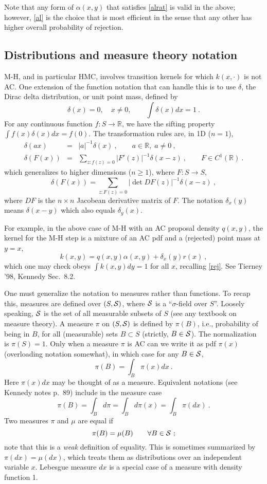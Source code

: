 \documentclass[10pt]{article}
\newcommand{\be}{\begin{equation}}
\newcommand{\ee}{\end{equation}}
\newcommand{\bea}{\begin{eqnarray}}
\newcommand{\eea}{\end{eqnarray}}
\newcommand{\R}{\mathbb{R}}
\newcommand{\al}{\alpha}
\begin{document}
Note that any form of $\al(x,y)$ that satisfies \eqref{alrat} is valid
in the above; however, \eqref{al} is the choice that is most efficient
in the sense that any other has higher overall probability of rejection.


\subsection{Distributions and measure theory notation}

M-H, and in particular HMC,
involves transition kernels for which $k(x,\cdot)$
is not AC.
One extension of the function notation that can handle
this is to use $\delta$, the Dirac delta distribution, or unit point mass, defined by
$$
\delta(x) = 0, \quad x\neq 0, \qquad \int \delta(x) dx = 1~.
$$
For any continuous function $f:S \to \R$, we have the sifting property
$\int f(x) \delta(x) dx = f(0)$.
The transformation rules are, in 1D ($n=1$),
\bea
\delta(ax) &=& |a|^{-1} \delta(x)~, \qquad a \in \R, \; a\neq 0~,
\\
\delta(F(x)) &=& \sum_{z: f(z) = 0} |F'(z)|^{-1} \delta(x-z)~,
\qquad F\in C^1(\R)~.
\eea
which generalizes to higher dimensions ($n\ge 1$), where $F:S\to S$,
\be
\delta(F(x)) = \sum_{z: F(z) = 0} |\det DF(z)|^{-1} \delta(x-z)~,
\ee
where $DF$ is the $n\times n$ Jacobean derivative matrix of $F$.
The notation $\delta_x(y)$ means $\delta(x-y)$ which also equals $\delta_y(x)$.

For example, in the above case of M-H with an AC proposal density
$q(x,y)$, the kernel for the M-H step
is a mixture of an AC pdf and a (rejected) point mass at $y=x$,
\be
k(x,y) = q(x,y)\al(x,y) + \delta_x(y) r(x)~,
\label{mhker}
\ee
which one may check obeys $\int k(x,y) dy=1$ for all $x$,
recalling \eqref{rej}.
See Tierney '98, Kennedy Sec.~8.2.

One must generalize the notation to measures rather than
functions.
To recap this,
measures are defined over $(S,\cal S)$, where $\cal S$ is a
``$\sigma$-field over $S$''.
Loosely speaking, $\cal S$ is the set of all measurable
subsets of $S$ (see any textbook on measure theory).
A measure $\pi$ on $(S,\cal S)$ is defined by
$\pi(B)$, i.e., probability of being in $B$,
for all (measurable) sets $B\subset S$ (strictly, $B\in \cal S$).
The normalization is $\pi(S) = 1$.
Only when a measure $\pi$ is AC
can we write it as pdf $\pi(x)$
(overloading notation somewhat),
in which case for any $B\in\cal S$,
$$
\pi(B) = \int_B \pi(x) dx~.
$$
Here $\pi(x) dx$ may be thought of as a measure.
Equivalent notations (see Kennedy notes p.~89) include in the measure case
$$
\pi(B) = \int_B d\pi = \int_B d\pi(x) = \int_B \pi(dx) ~.
$$
Two measures $\pi$ and $\mu$ are equal if
$$
\pi(B) = \mu(B) \qquad \forall B\in\cal S~;
$$
note that this is a {\em weak} definition of equality.
This is sometimes summarized by $\pi(dx) = \mu(dx)$, which treats them
as distributions over an independent variable $x$.
Lebesgue measure $dx$ is a special case of a measure with density function 1.
\end{document}

